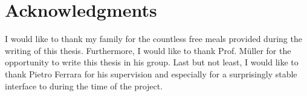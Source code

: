 \chapter*{Acknowledgments}
	\label{Acknowledgments}

	I would like to thank my family for the countless free meals provided during the writing of this thesis. Furthermore, I would like to thank Prof. M\"uller for the opportunity to write this thesis in his group. Last but not least, I would like to thank Pietro Ferrara for his supervision and especially for a surprisingly stable interface to \sample during the time of the project.


